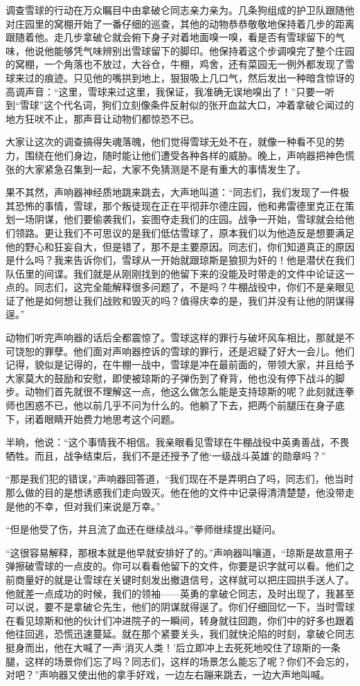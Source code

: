 调查雪球的行动在万众瞩目中由拿破仑同志亲力亲为。几条狗组成的护卫队跟随他对庄园里的窝棚开始了一番仔细的巡查，其他的动物恭恭敬敬地保持着几步的距离跟随着他。走几步拿破仑就会俯下身子对着地面嗅一嗅，看是否有雪球留下的气味，他说他能够凭气味辨别出雪球留下的脚印。他保持着这个步调嗅完了整个庄园的窝棚，一个角落也不放过，大谷仓，牛棚，鸡舍，还有菜园无一例外都发现了雪球来过的痕迹。只见他的嘴拱到地上，狠狠吸上几口气，然后发出一种暗含惊讶的高调声音：“这里，雪球来过这里，我保证，我准确无误地嗅出了！”只要一听到“雪球”这个代名词，狗们立刻像条件反射似的张开血盆大口，冲着拿破仑闻过的地方狂吠不止，那声音让动物们都惊恐不已。

大家让这次的调查搞得失魂落魄，他们觉得雪球无处不在，就像一种看不见的势力，围绕在他们身边，随时能让他们遭受各种各样的威胁。晚上，声响器把神色慌张的大家紧急召集到一起，大家不免猜测是不是有重大的事情发生了。

果不其然，声响器神经质地跳来跳去，大声地叫道：“同志们，我们发现了一件极其恐怖的事情，雪球，那个叛徒现在正在平彻菲尔德庄园，他和弗雷德里克正在策划一场阴谋，他们要偷袭我们，妄图夺走我们的庄园。战争一开始，雪球就会给他们领路。更让我们不可思议的是我们低估雪球了，原本我们以为他造反是想要满足他的野心和狂妄自大，但是错了，那不是主要原因。同志们，你们知道真正的原因是什么吗？我来告诉你们，雪球从一开始就跟琼斯是狼狈为奸的！他是潜伏在我们队伍里的间谍。我们就是从刚刚找到的他留下来的没能及时带走的文件中论证这一点的。同志们，这完全能解释很多问题了，不是吗？牛棚战役中，你们不是亲眼见证了他是如何想让我们战败和毁灭的吗？值得庆幸的是，我们并没有让他的阴谋得逞。”

动物们听完声响器的话后全都震惊了。雪球这样的罪行与破坏风车相比，那就是不可饶恕的罪孽。他们面对声响器控诉的雪球的罪行，还是迟疑了好大一会儿。他们记得，貌似是记得的，在牛棚一战中，雪球是冲在最前面的，带领大家，并且给予大家莫大的鼓励和安慰，即使被琼斯的子弹伤到了脊背，他也没有停下战斗的脚步。动物们首先就很不理解这一点，他这么做怎么能是支持琼斯的呢？此刻就连拳师也困惑不已，他以前几乎不问为什么的。他躺了下去，把两个前腿压在身子底下，闭着眼睛开始费力地思考这个问题。

半晌，他说：“这个事情我不相信。我亲眼看见雪球在牛棚战役中英勇善战，不畏牺牲。而且，战争结束后，我们不是还授予了他‘一级战斗英雄’的勋章吗？”

“那是我们犯的错误，”声响器回答道，“我们现在不是弄明白了吗，同志们，他当时那么做的目的是想诱惑我们走向毁灭。他在他的文件中记录得清清楚楚，他没带走是他的不幸，但对我们来说是万幸。”

“但是他受了伤，并且流了血还在继续战斗。”拳师继续提出疑问。

“这很容易解释，那根本就是他早就安排好了的。”声响器叫嚷道，“琼斯是故意用子弹擦破雪球的一点皮的。你可以看看他留下的文件，你要是识字就可以看。他们之前商量好的就是让雪球在关键时刻发出撤退信号，这样就可以把庄园拱手送人了。他就差一点成功的时候，我们的领袖——英勇的拿破仑同志，及时出现了，我甚至可以说，要不是拿破仑先生，他们的阴谋就得逞了。你们仔细回忆一下，当时雪球在看见琼斯和他的伙计们冲进院子的一瞬间，转身就往回跑，你们中的好多也跟着他往回逃，恐慌迅速蔓延。就在那个紧要关头，我们就快沦陷的时刻，拿破仑同志挺身而出，他在大喊了一声‘消灭人类！’后立即冲上去死死地咬住了琼斯的一条腿，这样的场景你们忘了吗？同志们，这样的场景怎么能忘了呢？你们不会忘的，对吧？”声响器又使出他的拿手好戏，一边左右蹦来跳去，一边大声地叫喊。

